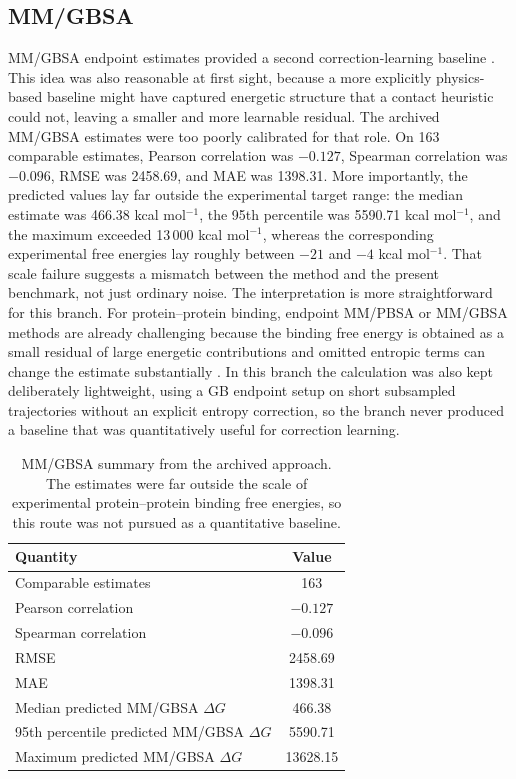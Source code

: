 \subsection{MM/GBSA}

MM/GBSA endpoint estimates provided a second correction-learning baseline \citep{Massova2000MMPBSA}. This idea was also reasonable at first sight, because a more explicitly physics-based baseline might have captured energetic structure that a contact heuristic could not, leaving a smaller and more learnable residual. The archived MM/GBSA estimates were too poorly calibrated for that role. On 163 comparable estimates, Pearson correlation was $-0.127$, Spearman correlation was $-0.096$, RMSE was 2458.69, and MAE was 1398.31. More importantly, the predicted values lay far outside the experimental target range: the median estimate was 466.38 kcal mol$^{-1}$, the 95th percentile was 5590.71 kcal mol$^{-1}$, and the maximum exceeded 13\,000 kcal mol$^{-1}$, whereas the corresponding experimental free energies lay roughly between $-21$ and $-4$ kcal mol$^{-1}$. That scale failure suggests a mismatch between the method and the present benchmark, not just ordinary noise. The interpretation is more straightforward for this branch. For protein--protein binding, endpoint MM/PBSA or MM/GBSA methods are already challenging because the binding free energy is obtained as a small residual of large energetic contributions and omitted entropic terms can change the estimate substantially \citep{Massova2000MMPBSA,Siebenmorgen2020PPIReview}. In this branch the calculation was also kept deliberately lightweight, using a GB endpoint setup on short subsampled trajectories without an explicit entropy correction, so the branch never produced a baseline that was quantitatively useful for correction learning.

\begin{table}[t]
\centering
\small
\begin{tabular}{|l|c|}
\hline
Quantity & Value \\
\hline
Comparable estimates & 163 \\
Pearson correlation & $-0.127$ \\
Spearman correlation & $-0.096$ \\
RMSE & 2458.69 \\
MAE & 1398.31 \\
Median predicted MM/GBSA $\Delta G$ & 466.38 \\
95th percentile predicted MM/GBSA $\Delta G$ & 5590.71 \\
Maximum predicted MM/GBSA $\Delta G$ & 13628.15 \\
\hline
\end{tabular}
\caption{MM/GBSA summary from the archived approach. The estimates were far outside the scale of experimental protein--protein binding free energies, so this route was not pursued as a quantitative baseline.}
\label{tab:appendix-mmgbsa}
\end{table}

